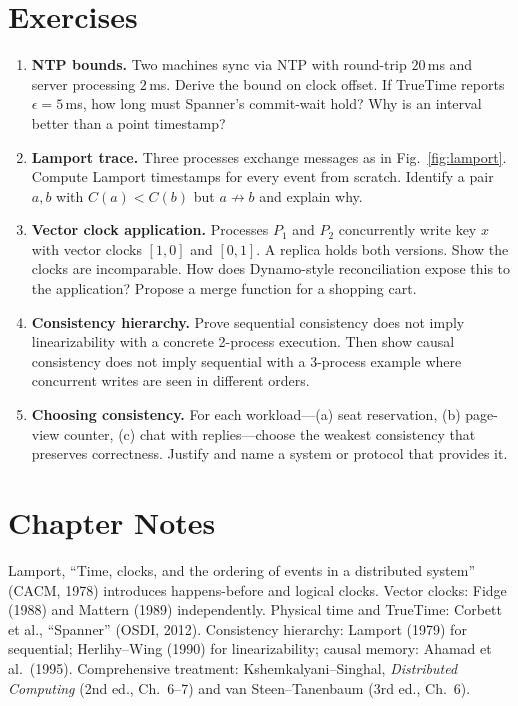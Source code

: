 \section{Exercises}
\label{sec:ch02-exercises}
\begin{enumerate}[label=E2.\arabic*, leftmargin=*, itemsep=0.6em]
    \item \textbf{NTP bounds.} Two machines sync via NTP with round-trip $20$\,ms and server processing $2$\,ms. Derive the bound on clock offset. If TrueTime reports $\epsilon=5$\,ms, how long must Spanner's commit-wait hold? Why is an interval better than a point timestamp?
    \item \textbf{Lamport trace.} Three processes exchange messages as in Fig.~\ref{fig:lamport}. Compute Lamport timestamps for every event from scratch. Identify a pair $a,b$ with $C(a)<C(b)$ but $a\not\to b$ and explain why.
    \item \textbf{Vector clock application.} Processes $P_1$ and $P_2$ concurrently write key $x$ with vector clocks $[1,0]$ and $[0,1]$. A replica holds both versions. Show the clocks are incomparable. How does Dynamo-style reconciliation expose this to the application? Propose a merge function for a shopping cart.
    \item \textbf{Consistency hierarchy.} Prove sequential consistency does not imply linearizability with a concrete 2-process execution. Then show causal consistency does not imply sequential with a 3-process example where concurrent writes are seen in different orders.
    \item \textbf{Choosing consistency.} For each workload---(a) seat reservation, (b) page-view counter, (c) chat with replies---choose the weakest consistency that preserves correctness. Justify and name a system or protocol that provides it.
\end{enumerate}

\section*{Chapter Notes}
Lamport, ``Time, clocks, and the ordering of events in a distributed system'' (CACM, 1978) introduces happens-before and logical clocks. Vector clocks: Fidge (1988) and Mattern (1989) independently. Physical time and TrueTime: Corbett et al., ``Spanner'' (OSDI, 2012). Consistency hierarchy: Lamport (1979) for sequential; Herlihy--Wing (1990) for linearizability; causal memory: Ahamad et al.\ (1995). Comprehensive treatment: Kshemkalyani--Singhal, \emph{Distributed Computing} (2nd ed., Ch.~6--7) and van Steen--Tanenbaum (3rd ed., Ch.~6).

